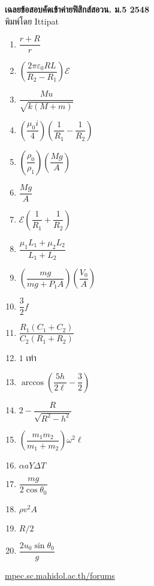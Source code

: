 \documentclass[a4paper,12pt]{article}
\begin{document}
\thispagestyle{empty}
\begin{center}
	{\huge \textbf{เฉลยข้อสอบคัดเข้าค่ายฟิสิกส์สอวน. ม.\textenglish{5} 2548}}\\
	พิมพ์โดย Ittipat\\
\end{center}
\begin{enumerate}
	\item \(\dfrac{r + R}{r}\)
	\item \(\left (\dfrac {2\pi \varepsilon_0 RL}{R_2 - R_1} \right ) \mathcal{E}\)
	\item \(\dfrac{Mu}{\sqrt{k(M+m)}}\)
	\item \(\left(\dfrac{\mu_0 i}{4}\right) \left( \dfrac{1}{R_1} - \dfrac{1}{R_2} \right)\)
	\item \(\left(\dfrac{\rho_0}{\rho_1}\right) \left(\dfrac{Mg}{A}\right) \)
	\item \(\dfrac{Mg}{A} \)
	\item \(\mathcal{E} \left(\dfrac{1}{R_1} + \dfrac{1}{R_2}\right) \)
	\item \(\dfrac{\mu_1 L_1 + \mu_2 L_2}{L_1 + L_2} \)
	\item \(\left(\dfrac{mg}{mg + P_1A} \right) \left( \dfrac{V_0}{A}\right) \)
	\item \(\dfrac{3}{2} f\)
	\item \(\dfrac{R_1(C_1+C_2)}{C_2(R_1+R_2)}\)
	\item \(1\) เท่า
	\item \(\arccos \left ( \dfrac{5h}{2\ell} - \dfrac{3}{2} \right)\)
	\item \(2 - \dfrac{R}{\sqrt{R^2 - h^2}}\)
	\item \(\left(\dfrac{m_1m_2}{m_1 + m_2} \right) \omega^2\ell\)
	\item \(\alpha aY\Delta T\)
	\item \(\dfrac{mg}{2\cos \theta_0}\)
	\item \(\rho v^2 A\)
	\item \(R/2\)
	\item \(\dfrac{2u_0 \sin \theta_0}{g}\)
\end{enumerate}
\vfill	
\begin{center}
	\href{http://mpec.sc.mahidol.ac.th/forums/}{mpec.sc.mahidol.ac.th/forums}
\end{center}
\end{document}
